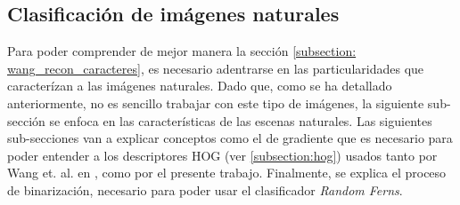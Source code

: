 \newpage
\subsection{Clasificación de imágenes naturales}

	Para poder comprender de mejor manera la sección \ref{subsection: wang_recon_caracteres}, es necesario adentrarse en las particularidades que caracterízan a las imágenes naturales. Dado que, como se ha detallado anteriormente, no es sencillo trabajar con este tipo de imágenes, la siguiente sub-sección se enfoca en las características de las escenas naturales. Las siguientes sub-secciones van a explicar conceptos como el de gradiente que es necesario para poder entender a los descriptores HOG (ver \ref{subsection:hog}) usados tanto por Wang et. al. en \cite{wang}, como por el presente trabajo. Finalmente, se explica el proceso de binarización, necesario para poder usar el clasificador \textit{Random Ferns}.

	
	
	
	
